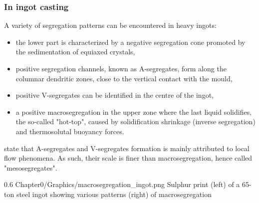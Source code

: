 \subsubsection*{In ingot casting}
A variety of segregation patterns can be encountered in heavy ingots: 
\begin{itemize}
\itemsep0em 
\item the lower part is characterized by a negative segregation cone promoted by the sedimentation of 
	  equiaxed crystals,
\item positive segregation channels, known as A-segregates, form along the columnar dendritic zones, close to the vertical contact with the mould,
\item positive V-segregates can be identified in the centre of the ingot,
\item a positive macrosegregation in the upper zone where the last liquid solidifies, the so-called "hot-top", caused by solidification shrinkage (inverse segregation)
	  and thermosolutal buoyancy forces. 
\end{itemize}
\citet{combeau_prediction_2009} state that A-segregates and V-segregates formation is mainly attributed to local flow phenomena.
As such, their scale is finer than macrosegregation, hence called "mesosegregates".
\begin{figureth}
{0.6}
{Chapter0/Graphics/macrosegregation_ingot.png}
{Sulphur print (left) of a 65-ton steel ingot showing various patterns (right) of macrosegregation \citep{flemings_solidification_1974, lesoult_macrosegregation_2005}}
\label{macrosegregation_ingot}
\end{figureth}
